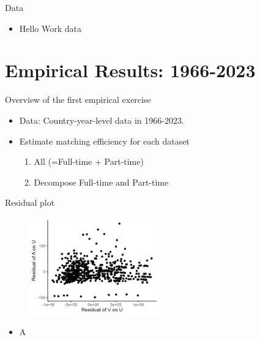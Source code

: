 \documentclass[aspectratio=169]{beamer}
\begin{document}
\begin{frame}{Data}
  \begin{itemize}
      \item Hello Work data
  \end{itemize}
\end{frame}



\section{Empirical Results: 1966-2023}


\begin{frame}{Overview of the first empirical exercise}
    \begin{itemize}
        \item Data: Country-year-level data in 1966-2023.
        \item Estimate matching efficiency for each dataset
        \begin{enumerate}
            \item All (=Full-time + Part-time)
            \item Decompose Full-time and Part-time
        \end{enumerate}
    \end{itemize}
\end{frame}

\begin{frame}{Residual plot}
    \begin{figure}[!ht]
  \begin{center}
  \includegraphics[width = 0.50\textwidth]
  {figuretable/residual_plot_month_aggregate.png}
  \end{center}
  \footnotesize
\end{figure} 
\begin{itemize}
    \item A
\end{itemize}
\end{frame}
\end{document}

